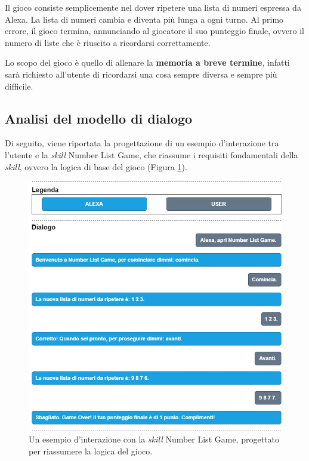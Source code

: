 Il gioco consiste semplicemente nel dover ripetere una lista di numeri espressa
da Alexa. La lista di numeri cambia e diventa più lunga a ogni turno. Al primo
errore, il gioco termina, annunciando al giocatore il suo punteggio finale,
ovvero il numero di liste che è riuscito a ricordarsi correttamente.

Lo scopo del gioco è quello di allenare la \textbf{memoria a breve termine},
infatti sarà richiesto all’utente di ricordarsi una cosa sempre diversa e
sempre più difficile.

\subsection{Analisi del modello di dialogo}
\label{subsec:Sezione4.1.1}

Di seguito, viene riportata la progettazione di un esempio d'interazione tra
l’utente e la \textit{skill} Number List Game, che riassume i requisiti
fondamentali della \textit{skill}, ovvero la logica di base del gioco (Figura
\ref{fig:figure4.1}).

\begin{figure}[!ht]
  \centering
  \includegraphics[scale=0.5]{resources/images/analysis/skill-flow-example/number-list-game-flow-example.jpg}
  \caption{
    Un esempio d'interazione con la \textit{skill} Number List Game,
    progettato per riassumere la logica del gioco.
  }
  \label{fig:figure4.1}
\end{figure}

